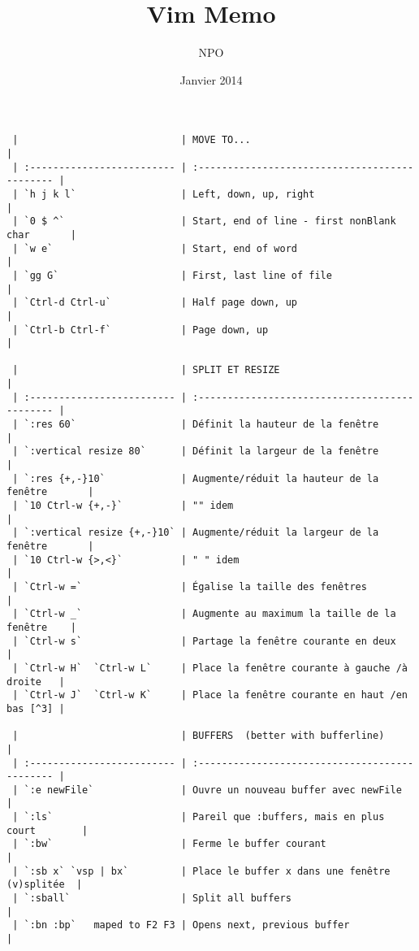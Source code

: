 \documentclass[10pt,landscape]{article}
\title{Vim Memo}
\author{NPO}
\date{Janvier 2014}
\begin{document}

\begin{multicols}{2}
\begin{verbatim}
 |                            | MOVE TO...                                     |
 | :------------------------- | :--------------------------------------------- |
 | `h j k l`                  | Left, down, up, right                          |
 | `0 $ ^`                    | Start, end of line - first nonBlank char       |
 | `w e`                      | Start, end of word                             |
 | `gg G`                     | First, last line of file                       |
 | `Ctrl-d Ctrl-u`            | Half page down, up                             |
 | `Ctrl-b Ctrl-f`            | Page down, up                                  |

 |                            | SPLIT ET RESIZE                                |
 | :------------------------- | :--------------------------------------------- |
 | `:res 60`                  | Définit la hauteur de la fenêtre               |
 | `:vertical resize 80`      | Définit la largeur de la fenêtre               |
 | `:res {+,-}10`             | Augmente/réduit la hauteur de la fenêtre       |
 | `10 Ctrl-w {+,-}`          | "" idem                                        |
 | `:vertical resize {+,-}10` | Augmente/réduit la largeur de la fenêtre       |
 | `10 Ctrl-w {>,<}`          | " " idem                                       |
 | `Ctrl-w =`                 | Égalise la taille des fenêtres                 |
 | `Ctrl-w _`                 | Augmente au maximum la taille de la fenêtre    |
 | `Ctrl-w s`                 | Partage la fenêtre courante en deux            |
 | `Ctrl-w H`  `Ctrl-w L`     | Place la fenêtre courante à gauche /à droite   |
 | `Ctrl-w J`  `Ctrl-w K`     | Place la fenêtre courante en haut /en bas [^3] |

 |                            | BUFFERS  (better with bufferline)              |
 | :------------------------- | :--------------------------------------------- |
 | `:e newFile`               | Ouvre un nouveau buffer avec newFile           |
 | `:ls`                      | Pareil que :buffers, mais en plus court        |
 | `:bw`                      | Ferme le buffer courant                        |
 | `:sb x` `vsp | bx`         | Place le buffer x dans une fenêtre (v)splitée  |
 | `:sball`                   | Split all buffers                              |
 | `:bn :bp`   maped to F2 F3 | Opens next, previous buffer                    |


\end{verbatim}
\end{multicols}
\end{document}

